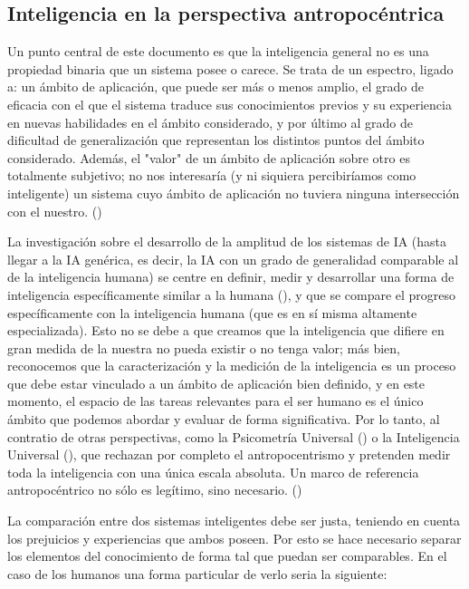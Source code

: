 \subsection{Inteligencia en la perspectiva antropocéntrica}

Un punto central de este documento es que la inteligencia general no es una propiedad binaria que un sistema posee o carece. Se trata de un espectro, ligado a: un ámbito de aplicación, que puede ser más o menos amplio, el grado de eficacia con el que el sistema traduce sus conocimientos previos y su experiencia en nuevas habilidades en el ámbito considerado, y por último al grado de dificultad de generalización que representan los distintos puntos del ámbito considerado. Además, el "valor" de un ámbito de aplicación sobre otro es totalmente subjetivo; no nos interesaría (y ni siquiera percibiríamos como inteligente) un sistema cuyo ámbito de aplicación no tuviera ninguna intersección con el nuestro. (\cite{chollet2019measure})

La investigación sobre el desarrollo de la amplitud de los sistemas de IA (hasta llegar a la IA genérica, es decir, la IA con un grado de generalidad comparable al de la inteligencia humana) se centre en definir, medir y desarrollar una forma de inteligencia específicamente similar a la humana (\cite{goertzel2012architecture}), y que se compare el progreso específicamente con la inteligencia humana (que es en sí misma altamente especializada). Esto no se debe a que creamos que la inteligencia que difiere en gran medida de la nuestra no pueda existir o no tenga valor; más bien, reconocemos que la caracterización y la medición de la inteligencia es un proceso que debe estar vinculado a un ámbito de aplicación bien definido, y en este momento, el espacio de las tareas relevantes para el ser humano es el único ámbito que podemos abordar y evaluar de forma significativa. Por lo tanto, al contratio de otras perspectivas, como la Psicometría Universal (\cite{hernandez2014universal}) o la Inteligencia Universal (\cite{legg2007universal}), que rechazan por completo el antropocentrismo y pretenden medir toda la inteligencia con una única escala absoluta. Un marco de referencia antropocéntrico no sólo es legítimo, sino necesario. (\cite{chollet2019measure})

La comparación entre dos sistemas inteligentes debe ser justa, teniendo en cuenta los prejuicios y experiencias que ambos poseen. Por esto se hace necesario separar los elementos del conocimiento de forma tal que puedan ser comparables. En el caso de los humanos una forma particular de verlo seria la siguiente:

